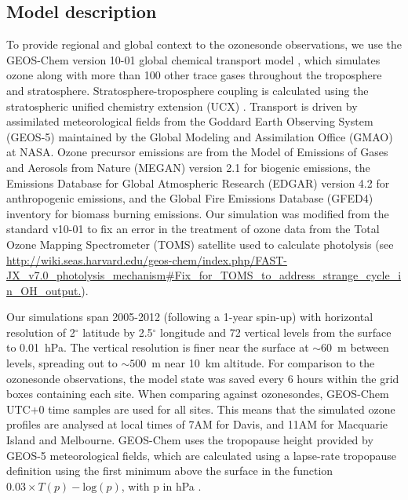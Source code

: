   \subsection{Model description}
    \label{Ozone:GEOSChemDescription}
    To provide regional and global context to the ozonesonde observations, we use the GEOS-Chem version 10-01 global chemical transport model \citep{Bey2001}, which simulates ozone along with more than 100 other trace gases throughout the troposphere and stratosphere. 
    Stratosphere-troposphere coupling is calculated using the stratospheric unified chemistry extension (UCX) \citep{Eastham2014}.
    Transport is driven by assimilated meteorological fields from the Goddard Earth Observing System (GEOS-5) maintained by the Global Modeling and Assimilation Office (GMAO) at NASA.
    Ozone precursor emissions are from the Model of Emissions of Gases and Aerosols from Nature (MEGAN) version 2.1 \citep{Guenther2012} for biogenic emissions, the Emissions Database for Global Atmospheric Research (EDGAR) version 4.2 for anthropogenic emissions, and the Global Fire Emissions Database (GFED4) inventory \citep{Giglio2013} for biomass burning emissions. 
    Our simulation was modified from the standard v10-01 to fix an error in the treatment of ozone data from the Total Ozone Mapping Spectrometer (TOMS) satellite used to calculate photolysis (see \url{http://wiki.seas.harvard.edu/geos-chem/index.php/FAST-JX_v7.0_photolysis_mechanism#Fix_for_TOMS_to_address_strange_cycle_in_OH_output.}).  
    
    Our simulations span 2005-2012 (following a 1-year spin-up) with horizontal resolution of 2$^{\circ}$ latitude by 2.5$^{\circ}$ longitude and 72 vertical levels from the surface to 0.01~hPa.
    The vertical resolution is finer near the surface at $\sim 60$~m between levels, spreading out to $\sim 500$~m near 10~km altitude.
    For comparison to the ozonesonde observations, the model state was saved every 6 hours within the grid boxes containing each site.
    When comparing against ozonesondes, GEOS-Chem UTC+0 time samples are used for all sites.
    This means that the simulated ozone profiles are analysed at local times of 7AM for Davis, and 11AM for Macquarie Island and Melbourne.
    GEOS-Chem uses the tropopause height provided by GEOS-5 meteorological fields, which are calculated using a lapse-rate tropopause definition using the first minimum above the surface in the function $0.03 \times T(p) - \mathrm{log}(p)$, with p in hPa \citep{Rienecker2008}.
  
